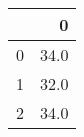 \begin{tabular}{lr}
\toprule
{} &     0 \\
\midrule
0 &  34.0 \\
1 &  32.0 \\
2 &  34.0 \\
\bottomrule
\end{tabular}
